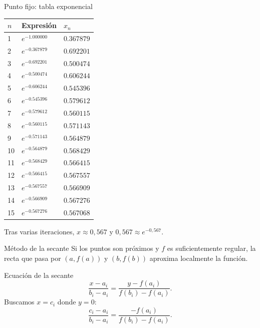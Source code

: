 \documentclass[main.tex]{subfiles}
\begin{document}
\begin{frame}{Punto fijo: tabla exponencial}
{\scriptsize\setlength{\tabcolsep}{5pt}\begin{center}\begin{tabular}{|C{.08\textwidth}|C{.34\textwidth}|C{.25\textwidth}|}\hline $n$ & Expresión & $x_n$\\\hline
\rule{0pt}{2.6mm}1 & $e^{-1.000000}$ & $0.367879$\\\hline
\rule{0pt}{2.6mm}2 & $e^{-0.367879}$ & $0.692201$\\\hline
\rule{0pt}{2.6mm}3 & $e^{-0.692201}$ & $0.500474$\\\hline
\rule{0pt}{2.6mm}4 & $e^{-0.500474}$ & $0.606244$\\\hline
\rule{0pt}{2.6mm}5 & $e^{-0.606244}$ & $0.545396$\\\hline
\rule{0pt}{2.6mm}6 & $e^{-0.545396}$ & $0.579612$\\\hline
\rule{0pt}{2.6mm}7 & $e^{-0.579612}$ & $0.560115$\\\hline
\rule{0pt}{2.6mm}8 & $e^{-0.560115}$ & $0.571143$\\\hline
\rule{0pt}{2.6mm}9 & $e^{-0.571143}$ & $0.564879$\\\hline
\rule{0pt}{2.6mm}10 & $e^{-0.564879}$ & $0.568429$\\\hline
\rule{0pt}{2.6mm}11 & $e^{-0.568429}$ & $0.566415$\\\hline
\rule{0pt}{2.6mm}12 & $e^{-0.566415}$ & $0.567557$\\\hline
\rule{0pt}{2.6mm}13 & $e^{-0.567557}$ & $0.566909$\\\hline
\rule{0pt}{2.6mm}14 & $e^{-0.566909}$ & $0.567276$\\\hline
\rule{0pt}{2.6mm}15 & $e^{-0.567276}$ & $0.567068$\\\hline
\end{tabular}\end{center}}\footnotesize Tras varias iteraciones, $x\approx0{,}567$ y $0{,}567\approx e^{-0{,}567}$.
\end{frame}

\begin{frame}{Método de la secante}
Si los puntos son próximos y $f$ es suficientemente regular, la recta que pasa por $(a,f(a))$ y $(b,f(b))$ aproxima localmente la función.
\end{frame}

\begin{frame}{Ecuación de la secante}
\[\frac{x-a_i}{b_i-a_i}=\frac{y-f(a_i)}{f(b_i)-f(a_i)}.\]Buscamos $x=c_i$ donde $y=0$:\[\frac{c_i-a_i}{b_i-a_i}=\frac{-f(a_i)}{f(b_i)-f(a_i)}.\]
\end{frame}
\end{document}

